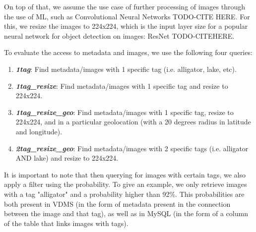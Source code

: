On top of that, we assume the use case of further processing of images
through the use of ML, such as Convolutional Neural Networks TODO-CITE HERE.
For this, we resize the images to 224x224, which is the input layer size for
a popular neural network for object detection on images: ResNet TODO-CITEHERE.

To evaluate the access to metadata and images,
we use the following four queries:
\begin{enumerate}
\item {\bf {\em 1tag}}: Find metadata/images with 1 specific tag (i.e. alligator, lake, etc).
\item {\bf {\em 1tag\_resize}}: Find metadata/images with 1 specific tag and resize to 224x224.
\item {\bf {\em 1tag\_resize\_geo}}: Find metadata/images with 1 specific tag, resize to 224x224, and in a particular geolocation (with a 20 degrees radius in latitude and longitude).
\item {\bf {\em 2tag\_resize\_geo}}: Find metadata/images with 2 specific tags (i.e. alligator AND lake) and resize to 224x224.
\end{enumerate}

It is important to note that then querying for images with certain tags, we
also apply a filter using the probability. To give an example, we only retrieve
images with a tag "alligator" and a probability higher than 92\%.
This probabilities are both present in VDMS (in the form of metadata present
in the connection between the image and that tag), as well as in MySQL (in
the form of a column of the table that links images with tags).

